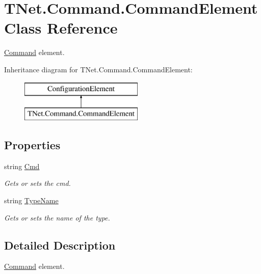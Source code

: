 \hypertarget{class_t_net_1_1_command_1_1_command_element}{}\section{T\+Net.\+Command.\+Command\+Element Class Reference}
\label{class_t_net_1_1_command_1_1_command_element}


\mbox{\hyperlink{namespace_t_net_1_1_command}{Command}} element.  


Inheritance diagram for T\+Net.\+Command.\+Command\+Element\+:\begin{figure}[H]
\begin{center}
\leavevmode
\includegraphics[height=2.000000cm]{class_t_net_1_1_command_1_1_command_element}
\end{center}
\end{figure}
\subsection*{Properties}
\begin{DoxyCompactItemize}
\item 
string \mbox{\hyperlink{class_t_net_1_1_command_1_1_command_element_ae5dd22f7fe363520954d24058a4f39f6}{Cmd}}
\begin{DoxyCompactList}\small\item\em Gets or sets the cmd. \end{DoxyCompactList}\item 
string \mbox{\hyperlink{class_t_net_1_1_command_1_1_command_element_aed90c0ff63dbfd339ab5247b42093144}{Type\+Name}}
\begin{DoxyCompactList}\small\item\em Gets or sets the name of the type. \end{DoxyCompactList}\end{DoxyCompactItemize}


\subsection{Detailed Description}
\mbox{\hyperlink{namespace_t_net_1_1_command}{Command}} element. 



